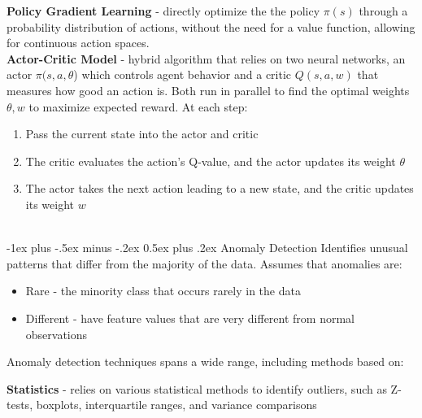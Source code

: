 \documentclass[10pt,landscape]{article}
\makeatletter
\renewcommand{\section}{\@startsection{section}{1}{0mm}%
                                {-1ex plus -.5ex minus -.2ex}%
                                {0.5ex plus .2ex}%
                                {\normalfont\large\bfseries}}
\makeatother
\begin{document}
\begin{multicols}{3}
\textbf{Policy Gradient Learning} - directly optimize the the policy $\pi(s)$ through a probability distribution of actions, without the need for a value function, allowing for continuous action spaces.  \\
\smallskip
\textbf{Actor-Critic Model} - hybrid algorithm that relies on two neural networks, an actor $\pi(s,a,\theta$) which controls agent behavior  and a critic $Q(s,a,w)$ that measures how good an action is. Both run in parallel to find the optimal weights $\theta, w$ to maximize expected reward. At each step:
\begin{enumerate}[leftmargin=5mm]
\itemsep -.4mm
\item Pass the current state into the actor and critic
\item The critic evaluates the action's Q-value, and the actor updates its weight $\theta$
\item The actor takes the next action leading to a new state, and the critic updates its weight $w$
\end{enumerate}
\columnbreak

\textcolor{white}{.}\vspace{-3mm}\\ %
\section{Anomaly Detection}
Identifies unusual patterns that differ from the majority of the data. Assumes that anomalies are:
\begin{itemize}[label={--},leftmargin=4mm]
\itemsep -.4mm
\item Rare - the minority class that occurs rarely in the data
\item Different - have feature values that are very different from normal observations
\end{itemize}
\smallskip
Anomaly detection techniques spans a wide range, including methods based on:

\textbf{Statistics} - relies on various statistical methods to identify outliers, such as Z-tests, boxplots, interquartile ranges, and variance comparisons


\end{multicols}
\end{document}
